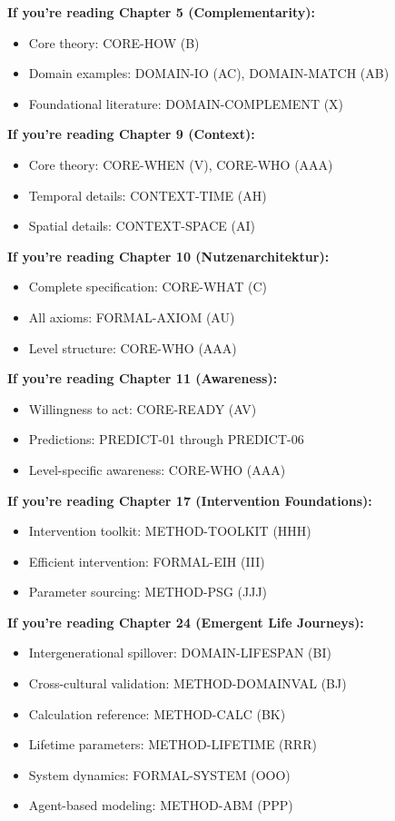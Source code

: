 \begin{tcolorbox}[colback=green!5!white, colframe=green!75!black, 
    title=How to Use: Chapter $\rightarrow$ Appendix]

\textbf{If you're reading Chapter 5 (Complementarity):}
\begin{itemize}[nosep]
\item Core theory: CORE-HOW (B)
\item Domain examples: DOMAIN-IO (AC), DOMAIN-MATCH (AB)
\item Foundational literature: DOMAIN-COMPLEMENT (X)
\end{itemize}

\textbf{If you're reading Chapter 9 (Context):}
\begin{itemize}[nosep]
\item Core theory: CORE-WHEN (V), CORE-WHO (AAA)
\item Temporal details: CONTEXT-TIME (AH)
\item Spatial details: CONTEXT-SPACE (AI)
\end{itemize}

\textbf{If you're reading Chapter 10 (Nutzenarchitektur):}
\begin{itemize}[nosep]
\item Complete specification: CORE-WHAT (C)
\item All axioms: FORMAL-AXIOM (AU)
\item Level structure: CORE-WHO (AAA)
\end{itemize}

\textbf{If you're reading Chapter 11 (Awareness):}
\begin{itemize}[nosep]
\item Willingness to act: CORE-READY (AV)
\item Predictions: PREDICT-01 through PREDICT-06
\item Level-specific awareness: CORE-WHO (AAA)
\end{itemize}

\textbf{If you're reading Chapter 17 (Intervention Foundations):}
\begin{itemize}[nosep]
\item Intervention toolkit: METHOD-TOOLKIT (HHH)
\item Efficient intervention: FORMAL-EIH (III)
\item Parameter sourcing: METHOD-PSG (JJJ)
\end{itemize}

\textbf{If you're reading Chapter 24 (Emergent Life Journeys):}
\begin{itemize}[nosep]
\item Intergenerational spillover: DOMAIN-LIFESPAN (BI)
\item Cross-cultural validation: METHOD-DOMAINVAL (BJ)
\item Calculation reference: METHOD-CALC (BK)
\item Lifetime parameters: METHOD-LIFETIME (RRR)
\item System dynamics: FORMAL-SYSTEM (OOO)
\item Agent-based modeling: METHOD-ABM (PPP)
\end{itemize}

\end{tcolorbox}

